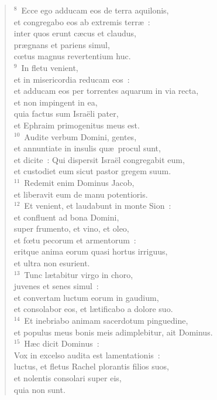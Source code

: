 \begin{flushleft}
\begin{verse}
${}^{8}$~Ecce ego adducam eos de terra aquilonis,\\ et congregabo eos ab extremis terr\ae~:\\ inter quos erunt c\ae cus et claudus,\\ pr\ae gnans et pariens simul,\\ cœtus magnus revertentium huc.\\
${}^{9}$~In fletu venient,\\ et in misericordia reducam eos~:\\ et adducam eos per torrentes aquarum in via recta,\\ et non impingent in ea,\\ quia factus sum Isra\"eli pater,\\ et Ephraim primogenitus meus est.\\
${}^{10}$~Audite verbum Domini, gentes,\\ et annuntiate in insulis qu\ae\ procul sunt,\\ et dicite~: Qui dispersit Isra\"el congregabit eum,\\ et custodiet eum sicut pastor gregem suum.\\
${}^{11}$~Redemit enim Dominus Jacob,\\ et liberavit eum de manu potentioris.\\
${}^{12}$~Et venient, et laudabunt in monte Sion~:\\ et confluent ad bona Domini,\\ super frumento, et vino, et oleo,\\ et fœtu pecorum et armentorum~:\\ eritque anima eorum quasi hortus irriguus,\\ et ultra non esurient.\\
${}^{13}$~Tunc l\ae tabitur virgo in choro,\\ juvenes et senes simul~:\\ et convertam luctum eorum in gaudium,\\ et consolabor eos, et l\ae tificabo a dolore suo.\\
${}^{14}$~Et inebriabo animam sacerdotum pinguedine,\\ et populus meus bonis meis adimplebitur, ait Dominus.\\
${}^{15}$~H\ae c dicit Dominus~:\\ Vox in excelso audita est lamentationis~:\\ luctus, et fletus Rachel plorantis filios suos,\\ et nolentis consolari super eis,\\ quia non sunt.\\

\end{verse}
\end{flushleft}
